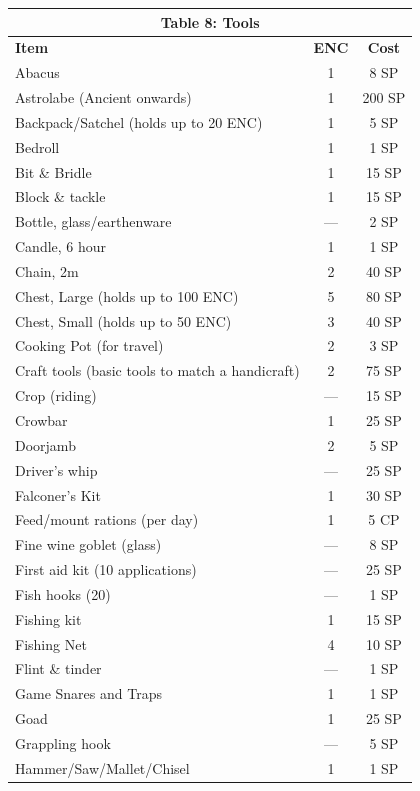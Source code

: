 \documentclass[10pt]{article}
\begin{document}
\begin{longtable}[c]{|l|c|c|}
\hline
\multicolumn{3}{|c|}{\textbf{Table 8: Tools}} \\
\hline
\textbf{Item} & \textbf{ENC} & \textbf{Cost} \\
\hline
Abacus & 1 & 8 SP \\
\hline
Astrolabe (Ancient onwards) & 1 & 200 SP \\
\hline
Backpack/Satchel (holds up to 20 ENC) & 1 & 5 SP \\
\hline
Bedroll & 1 & 1 SP \\
\hline
Bit \& Bridle & 1 & 15 SP \\
\hline
Block \& tackle & 1 & 15 SP \\
\hline
Bottle, glass/earthenware & — & 2 SP \\
\hline
Candle, 6 hour & 1 & 1 SP \\
\hline
Chain, 2m & 2 & 40 SP \\
\hline
Chest, Large (holds up to 100 ENC) & 5 & 80 SP \\
\hline
Chest, Small (holds up to 50 ENC) & 3 & 40 SP \\
\hline
Cooking Pot (for travel) & 2 & 3 SP \\
\hline
Craft tools (basic tools to match a handicraft) & 2 & 75 SP \\
\hline
Crop (riding) & — & 15 SP \\
\hline
Crowbar & 1 & 25 SP \\
\hline
Doorjamb & 2 & 5 SP \\
\hline
Driver's whip & — & 25 SP \\
\hline
Falconer's Kit & 1 & 30 SP \\
\hline
Feed/mount rations (per day) & 1 & 5 CP \\
\hline
Fine wine goblet (glass) & — & 8 SP \\
\hline
First aid kit (10 applications) & — & 25 SP \\
\hline
Fish hooks (20) & — & 1 SP \\
\hline
Fishing kit & 1 & 15 SP \\
\hline
Fishing Net & 4 & 10 SP \\
\hline
Flint \& tinder & — & 1 SP \\
\hline
Game Snares and Traps & 1 & 1 SP \\
\hline
Goad & 1 & 25 SP \\
\hline
Grappling hook & — & 5 SP \\
\hline
Hammer/Saw/Mallet/Chisel & 1 & 1 SP \\

\end{longtable}
\end{document}
